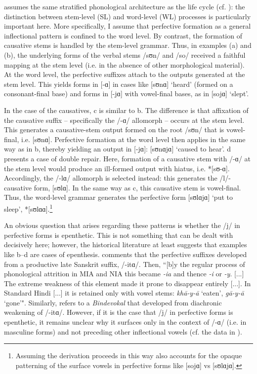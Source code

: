 \documentclass[output=paper,colorlinks,citecolor=brown]{langscibook}
\begin{document}
 assumes the same stratified phonological architecture as the life cycle (cf. \citealt{Bermúdez-Otero2011, Bermúdez-Otero2017, Kiparsky:2000}): the distinction between stem-level (SL) and word-level (WL) processes is particularly important here.  More specifically, I assume that perfective formation as a general inflectional pattern is confined to the word level.  By contrast, the formation of causative stems is handled by the stem-level grammar.  Thus, in examples (a) and (b), the underlying forms of the verbal stems /sʊn/ and /so/ received a faithful mapping at the stem level (i.e. in the absence of other morphological material).  At the word level, the perfective suffixes attach to the outputs generated at the stem level. This yields forms in [-ɑ] in cases like [sʊnɑ] `heard' (formed on a consonant-final base) and forms in [-jɑ] with vowel-final bases, as in [sojɑ] `slept'.

In the case of the causatives, c is similar to b.  The difference is that affixation of the causative suffix -- specifically the /-ɑ/ allomorph -- occurs at the stem level. This generates a causative-stem output formed on the root /sʊn/ that is vowel-final, i.e. [sʊnɑ]. Perfective formation at the word level then applies in the same way as in b, thereby yielding an output in [-jɑ]: [sʊnɑjɑ] `caused to hear'. d presents a case of double repair.  Here, formation of a causative stem with /-ɑ/ at the stem level would produce an ill-formed output with hiatus, i.e. *[sʊ-ɑ]. Accordingly, the /-lɑ/ allomorph is selected instead: this generates the /l/-causative form, [sʊlɑ].  In the same way as c, this causative stem is vowel-final. Thus, the word-level grammar generates the perfective form [sʊlɑjɑ] `put to sleep', *[sʊlɑɑ].\footnote{Assuming the derivation proceeds in this way also accounts for the opaque patterning of the surface vowels in perfective forms like [sojɑ] vs [sʊlɑjɑ].}  

An obvious question that arises regarding these patterns is whether the /j/ in perfective forms is epenthetic.  This is not something that can be dealt with decisively here; however, the historical literature at least suggests that examples like b–d are cases of epenthesis.  \citet[269]{Masica1991} comments that the perfective suffixes developed from a productive late Sanskrit suffix, /-itɑ/.  Then, ``[b]y the regular process of phonological attrition in MIA and NIA this became \textit{-ia} and thence \textit{-i} or \textit{-y}. [...] The extreme weakness of this element made it prone to disappear entirely [...]. In Standard Hindi [...] it is retained only with vowel stems: \textit{khā-y-ā} `eaten', \textit{gā-y-ā} `gone'".  Similarly, \citet[§439]{Mayrhofer1951} refers to a \textit{Bindevokal} that developed from diachronic weakening of /-itɑ/.  However, if it is the case that /j/ in perfective forms is epenthetic, it remains unclear why it surfaces only in the context of /-ɑ/ (i.e. in masculine forms) and not preceding other inflectional vowels (cf. the data in ).
\end{document}
